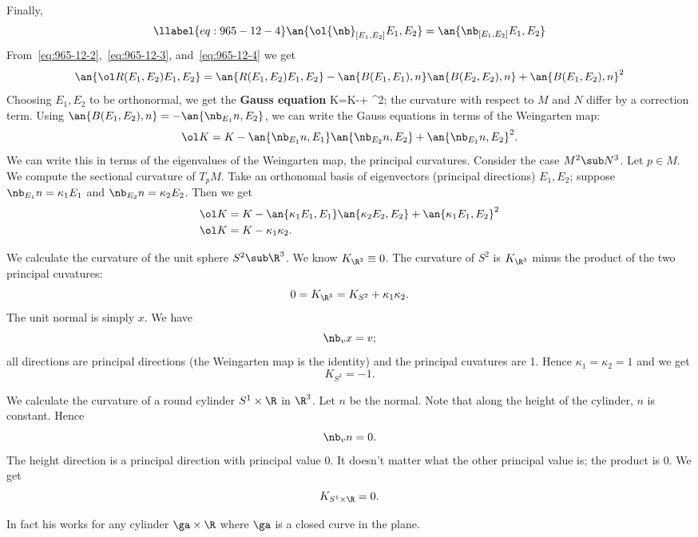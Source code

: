 Finally, 
\begin{equation}\llabel{eq:965-12-4}
\an{\ol{\nb}_{[E_1,E_2]} E_1,E_2}
=\an{\nb_{[E_1,E_2]}E_1,E_2}
\end{equation}
From~\eqref{eq:965-12-2},~\eqref{eq:965-12-3}, and~\eqref{eq:965-12-4} we get
\[
\an{\ol R(E_1,E_2)E_1,E_2}
=\an{R(E_1,E_2)E_1,E_2}
-\an{B(E_1,E_1),n}\an{B(E_2,E_2),n}
+\an{B(E_1,E_2),n}^2
\]
Choosing $E_1,E_2$ to be orthonormal, we get the \textbf{Gauss equation}
\ol K=K-+  ^2;
\eeq
the curvature with respect to $M$ and $N$ differ by a correction term. 
Using $\an{B(E_1,E_2),n}=-\an{\nb_{E_1} n, E_2}$, we can write the Gauss equations in terms of the Weingarten map:
\[
\ol K=K-\an{\nb_{E_1}n,E_1} \an{\nb_{E_2}n,E_2} +\an{\nb_{E_1}n,E_2}^2.
\]
We can write this in terms of the eigenvalues of the Weingarten map, the principal curvatures.
Consider the case $M^2\sub N^3$. Let $p\in M$. We compute the sectional curvature of $T_pM$. Take an orthonomal basis of eigenvectors (principal directions) $E_1,E_2$; suppose $\nb_{E_1}n=\kappa_1E_1$ and $\nb_{E_2}n=\kappa_2E_2$. Then we get
\begin{align*}
\ol K&=K-\an{\kappa_1E_1,E_1}\an{\kappa_2E_2,E_2}+\an{\kappa_1 E_1,E_2}^2\\
\ol K&=K-\kappa_1\kappa_2.
\end{align*}

\begin{ex}
We calculate the curvature of the unit sphere $S^2\sub \R^3$. We know $K_{\R^3}\equiv 0$. The curvature of $S^2$ is $K_{\R^3}$ minus the product of the two principal cuvatures:
\[
0=K_{\R^3} =K_{S^2}+\kappa_1\kappa_2.
\]
The unit normal is simply $x$. We have 
\[\nb_v x=v;\]
all directions are principal directions (the Weingarten map is the identity) and the principal cuvatures are 1. Hence $\kappa_1=\kappa_2=1$ and we get
\[
K_{S^2}=-1.
\]
\end{ex}
\vskip0.15in
\begin{ex}
We calculate the curvature of a round cylinder $S^1\times \R$ in $\R^3$. Let $n$ be the normal. Note that along the height of the cylinder, $n$ is constant. 
Hence
\[
\nb_v n=0.
\]
The height direction is a principal direction with principal value 0. It doesn't matter what the other principal value is; the product is 0. We get
\[
K_{S^1\times \R}=0.
\]

In fact his works for any cylinder $\ga\times \R$ where $\ga$ is a closed curve in the plane.
\end{ex}